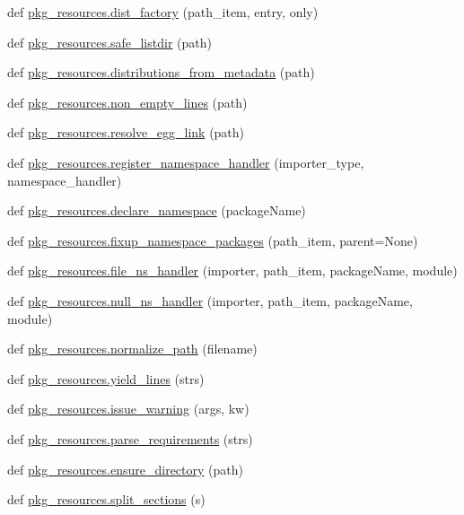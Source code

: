 \begin{DoxyCompactItemize}
def \hyperlink{namespacepkg__resources_a2dd2cfe9de57b827c6747e80e1ef18e2}{pkg\+\_\+resources.\+dist\+\_\+factory} (path\+\_\+item, entry, only)
\item 
def \hyperlink{namespacepkg__resources_a24a292f7cca8e380c17105cfc9d88955}{pkg\+\_\+resources.\+safe\+\_\+listdir} (path)
\item 
def \hyperlink{namespacepkg__resources_abbb0c07a5cceabd55690cf052dfbea0d}{pkg\+\_\+resources.\+distributions\+\_\+from\+\_\+metadata} (path)
\item 
def \hyperlink{namespacepkg__resources_aebf9bba27fbad2388790590cac11be48}{pkg\+\_\+resources.\+non\+\_\+empty\+\_\+lines} (path)
\item 
def \hyperlink{namespacepkg__resources_a6ae462ea407849fd77ba2ee61c3ba24c}{pkg\+\_\+resources.\+resolve\+\_\+egg\+\_\+link} (path)
\item 
def \hyperlink{namespacepkg__resources_acfe88771fd78c58a49378665ecc42e10}{pkg\+\_\+resources.\+register\+\_\+namespace\+\_\+handler} (importer\+\_\+type, namespace\+\_\+handler)
\item 
def \hyperlink{namespacepkg__resources_a56e0436c68d4a6a6d3674c418b628593}{pkg\+\_\+resources.\+declare\+\_\+namespace} (package\+Name)
\item 
def \hyperlink{namespacepkg__resources_a636b14ccc961320b5238ba240e2bfc24}{pkg\+\_\+resources.\+fixup\+\_\+namespace\+\_\+packages} (path\+\_\+item, parent=None)
\item 
def \hyperlink{namespacepkg__resources_ac4760ef4501d5e05f68cf9fef9af1cbe}{pkg\+\_\+resources.\+file\+\_\+ns\+\_\+handler} (importer, path\+\_\+item, package\+Name, module)
\item 
def \hyperlink{namespacepkg__resources_a518a17d31aee5bf71eee289b82f966d9}{pkg\+\_\+resources.\+null\+\_\+ns\+\_\+handler} (importer, path\+\_\+item, package\+Name, module)
\item 
def \hyperlink{namespacepkg__resources_a92fefe633fcea7303e233a72b5cb023b}{pkg\+\_\+resources.\+normalize\+\_\+path} (filename)
\item 
def \hyperlink{namespacepkg__resources_a0eafea5b96ff98a74cd3340af8bc1cc6}{pkg\+\_\+resources.\+yield\+\_\+lines} (strs)
\item 
def \hyperlink{namespacepkg__resources_a0d5beebf84841e70b7b06058e4fb4cc2}{pkg\+\_\+resources.\+issue\+\_\+warning} (args, kw)
\item 
def \hyperlink{namespacepkg__resources_a2f0871c15153dc97a4a5b22c363a541e}{pkg\+\_\+resources.\+parse\+\_\+requirements} (strs)
\item 
def \hyperlink{namespacepkg__resources_a184f9bf0699b317e84046c58d6b224cf}{pkg\+\_\+resources.\+ensure\+\_\+directory} (path)
\item 
def \hyperlink{namespacepkg__resources_ac538bbed636a0b964382693ba2a06742}{pkg\+\_\+resources.\+split\+\_\+sections} (s)
\end{DoxyCompactItemize}
